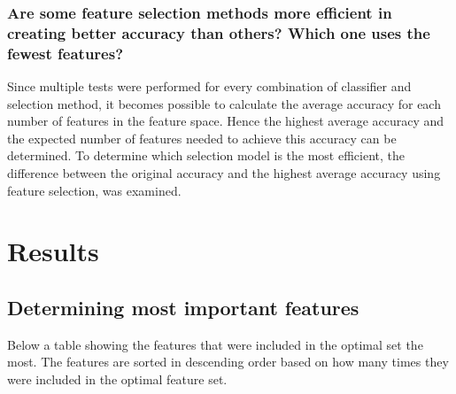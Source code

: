 \documentclass{kththesis}
\begin{document}
\subsection{Are some feature selection methods more efficient in creating better accuracy than others? Which one uses the fewest features?}
Since multiple tests were performed for every combination of classifier and selection method, it becomes possible to calculate the average accuracy for each number of features in the feature space. Hence the highest average accuracy and the expected number of features needed to achieve this accuracy can be determined. To determine which selection model is the most efficient, the difference between the original accuracy and the highest average accuracy using feature selection, was examined.







\chapter{Results}

\section{Determining most important features} %

Below a table showing the features that were included in the optimal set the most. The features are sorted in descending order based on how many times they were included in the optimal feature set.


\end{document}
